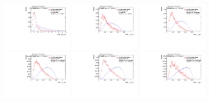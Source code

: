 \begin{figure}
\includegraphics[width=0.3\textwidth]{sascha_input/Appendix/Distributions/w/distributions/beta1/h_assisted_tj_D2_bin6.pdf}
\bigskip 
\includegraphics[width=0.3\textwidth]{sascha_input/Appendix/Distributions/w/distributions/beta1/h_assisted_tj_nSub21_bin1.pdf} \hspace{1mm}
\includegraphics[width=0.3\textwidth]{sascha_input/Appendix/Distributions/w/distributions/beta1/h_assisted_tj_nSub21_bin2.pdf} \hspace{1mm}
\includegraphics[width=0.3\textwidth]{sascha_input/Appendix/Distributions/w/distributions/beta1/h_assisted_tj_nSub21_bin3.pdf} 
\bigskip
\includegraphics[width=0.3\textwidth]{sascha_input/Appendix/Distributions/w/distributions/beta1/h_assisted_tj_nSub21_bin4.pdf} \hspace{6mm}
\includegraphics[width=0.3\textwidth]{sascha_input/Appendix/Distributions/w/distributions/beta1/h_assisted_tj_nSub21_bin5.pdf} \hspace{6mm}

\end{figure}
